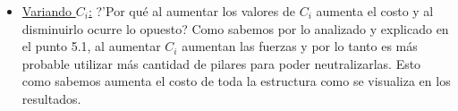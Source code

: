 \begin{itemize}
\item \underline{Variando $C_i$:} ?'Por qu\'e al aumentar los valores de $C_i$ aumenta el costo y al disminuirlo ocurre lo opuesto?
Como sabemos por lo analizado y explicado en el punto 5.1, al aumentar $C_i$ aumentan las fuerzas y por lo tanto es m\'as probable utilizar m\'as cantidad de pilares para poder neutralizarlas. Esto como sabemos aumenta el costo de toda la estructura como se visualiza en los resultados.
\end{itemize}


